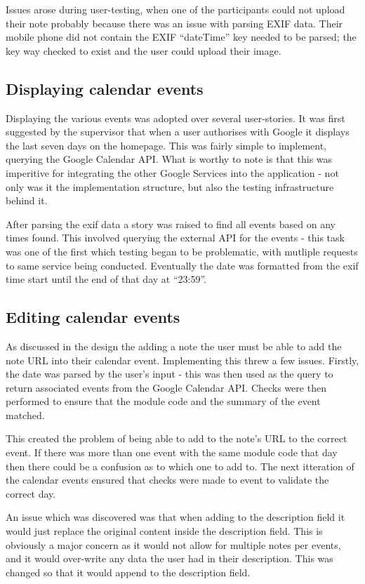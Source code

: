 Issues arose during user-testing, when one of the participants could not upload their note probably because there was an issue with parsing EXIF data. Their mobile phone did not contain the EXIF ``dateTime'' key needed to be parsed; the key way checked to exist and the user could upload their image.

\subsection{Displaying calendar events}
Displaying the various events was adopted over several user-stories. It was first suggested by the supervisor that when a user authorises with Google it displays the last seven days on the homepage. This was fairly simple to implement, querying the Google Calendar API. What is worthy to note is that this was imperitive for integrating the other Google Services into the application - not only was it the implementation structure, but also the testing infrastructure behind it.

After parsing the exif data a story was raised to find all events based on any times found. This involved querying the external API for the events - this task was one of the first which testing began to be problematic, with mutliple requests to same service being conducted. Eventually the date was formatted from the exif time start until the end of that day at ``23:59''.

\subsection{Editing calendar events}
As discussed in the design the adding a note the user must be able to add the note URL into their calendar event. Implementing this threw a few issues. Firstly, the date was parsed by the user's input - this was then used as the query to return associated events from the Google Calendar API. Checks were then performed to ensure that the module code and the summary of the event matched.

This created the problem of being able to add to the note's URL to the correct event. If there was more than one event with the same module code that day then there could be a confusion as to which one to add to. The next itteration of the calendar events ensured that checks were made to event to validate the correct day.

An issue which was discovered was that when adding to the description field it would just replace the original content inside the description field. This is obviously a major concern as it would not allow for multiple notes per events, and it would over-write any data the user had in their description. This was changed so that it would append to the description field.

